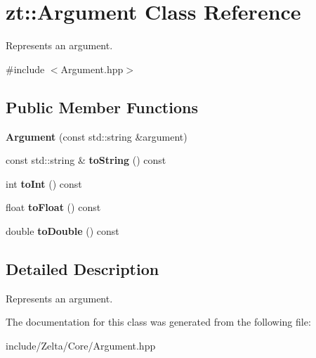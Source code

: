 \hypertarget{classzt_1_1_argument}{}\section{zt\+:\+:Argument Class Reference}
\label{classzt_1_1_argument}


Represents an argument.  




{\ttfamily \#include $<$Argument.\+hpp$>$}

\subsection*{Public Member Functions}
\begin{DoxyCompactItemize}
\item 
\mbox{\label{classzt_1_1_argument_ac257d125029defd69739a2caac476238}} 
{\bfseries Argument} (const std\+::string \&argument)
\item 
\mbox{\label{classzt_1_1_argument_af5927508c283ada9b42ca1a077dc0615}} 
const std\+::string \& {\bfseries to\+String} () const
\item 
\mbox{\label{classzt_1_1_argument_acfa50891baa70815c227bb0f385dcb1c}} 
int {\bfseries to\+Int} () const
\item 
\mbox{\label{classzt_1_1_argument_af937ac1ddbfd477a64e1052cbd37e8b7}} 
float {\bfseries to\+Float} () const
\item 
\mbox{\label{classzt_1_1_argument_a6242b3657c5a73d3d44cfe7f77488118}} 
double {\bfseries to\+Double} () const
\end{DoxyCompactItemize}


\subsection{Detailed Description}
Represents an argument. 

The documentation for this class was generated from the following file\+:\begin{DoxyCompactItemize}
\item 
include/\+Zelta/\+Core/Argument.\+hpp\end{DoxyCompactItemize}
